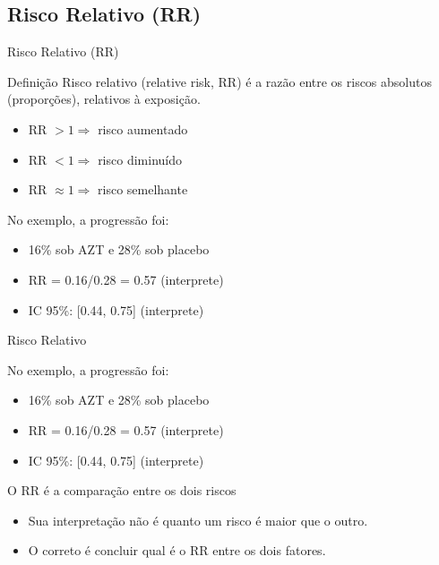 \documentclass{beamer}
\begin{document}
\subsection{Risco Relativo (RR)}

\begin{frame}{\scriptsize Risco Relativo (RR)}
  \begin{block}{Definição}
    \footnotesize
    Risco relativo (relative risk, RR) é a razão entre os riscos absolutos (proporções), relativos à exposição.
  \end{block}
  \begin{itemize}
  \item RR $> 1 \Rightarrow$ risco aumentado
  \item RR $< 1 \Rightarrow$ risco diminuído
  \item RR $\approx 1 \Rightarrow$ risco semelhante
  \end{itemize}
  \begin{exampleblock}{No exemplo, a progressão foi:}
    \begin{itemize}
    \item 16\% sob AZT e 28\% sob placebo
    \item RR = 0.16/0.28 = 0.57 (interprete)
    \item<2-> IC 95\%: [0.44, 0.75] (interprete)
    \end{itemize}
  \end{exampleblock}
\end{frame}

\begin{frame}{\scriptsize Risco Relativo}
  \begin{exampleblock}{No exemplo, a progressão foi:}
    \begin{itemize}
    \item 16\% sob AZT e 28\% sob placebo
    \item RR = 0.16/0.28 = 0.57 (interprete)
    \item IC 95\%: [0.44, 0.75] (interprete)
    \end{itemize}
  \end{exampleblock}
  \begin{block}{O RR é a comparação entre os dois riscos}
    \footnotesize
    \begin{itemize}
    \item Sua interpretação \alert{não é} quanto um risco é maior que o outro.
    \item O correto é concluir qual é o RR \alert{entre} os dois fatores.
    \end{itemize}
  \end{block}
\end{frame}
\end{document}
